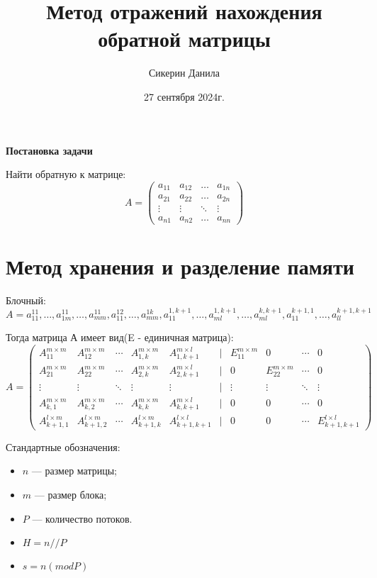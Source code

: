 \documentclass[a4paper,12pt]{article}
\begin{document}
\author{Сикерин Данила}
\title{Метод отражений нахождения обратной матрицы}
\date{27 сентября 2024г.}
\maketitle

\begin{center}
{\bfseries Постановка задачи}
\end{center}

Найти обратную к матрице:
$$A=
   \begin{pmatrix}
     a_{11}& a_{12} &\ldots & a_{1n}\\
     a_{21}& a_{22} &\ldots & a_{2n}\\
     \vdots& \vdots &\ddots & \vdots\\
     a_{n1}& a_{n2} &\ldots & a_{nn}
    \end{pmatrix}
$$ 
\section{Метод хранения и разделение памяти}
Блочный: $A = a_{11}^{11},\ldots,a_{1m}^{11},\ldots, a_{mm}^{11}, a_{11}^{12},\ldots, a_{mm}^{1k}, a_{11}^{1,k+1},\ldots, a_{ml}^{1,k+1},\ldots, a_{ml}^{k,k+1},a_{11}^{k+1,1}, \ldots, a_{ll}^{k+1,k+1}$

Тогда матрица А имеет вид(E - единичная матрица):
\begin{equation}
A=
  \begin{pmatrix} 
    A_{11}^{m \times m} & A_{12}^{m \times m} & \cdots & A_{1,k}^{m \times m} & A_{1,k+1}^{m \times l} & | & E_{11}^{m \times m} &0 & \cdots &0\\
    A_{21}^{m \times m} & A_{22}^{m \times m} & \cdots & A_{2,k}^{m \times m} & A_{2,k+1}^{m \times l} & | & 0 & E_{22}^{m \times m} & \cdots & 0\\ 
    \vdots & \vdots & \ddots & \vdots & \vdots & | & \vdots & \vdots & \ddots & \vdots\\ 
    A_{k,1}^{m \times m} & A_{k,2}^{m \times m} & \cdots & A_{k,k}^{m \times m} & A_{k,k+1}^{m \times l} & | & 0 & 0 & \cdots& 0\\
    A_{k+1,1}^{l \times m} & A_{k+1,2}^{l \times m} & \cdots & A_{k+1,k}^{l \times m} & A_{k+1,k+1}^{l \times l} & | & 0 & 0 & \cdots & E_{k+1,k+1}^{l \times l} 
  \end{pmatrix}
\end{equation}

Стандартные обозначения:
\begin{itemize}
    \item $n$ — размер матрицы;
    \item $m$ — размер блока;
    \item $P$ — количество потоков.
    \item $H = n//P$ 
    \item $s = n (mod P)$ 
  
\end{itemize}
\end{document}
